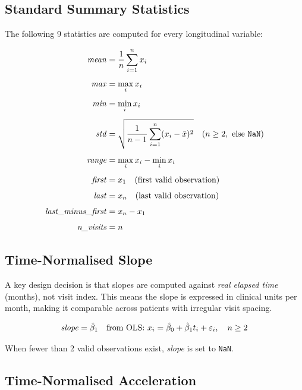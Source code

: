 \documentclass[11pt]{article}
\begin{document}
\subsection{Standard Summary Statistics}

The following 9 statistics are computed for every longitudinal variable:

\begin{align}
\text{\textit{mean}} &= \frac{1}{n} \sum_{i=1}^{n} x_i \label{eq:mean}\\[4pt]
\text{\textit{max}} &= \max_{i} x_i \\[4pt]
\text{\textit{min}} &= \min_{i} x_i \\[4pt]
\text{\textit{std}} &= \sqrt{\frac{1}{n-1}\sum_{i=1}^{n}(x_i - \bar{x})^2} \quad (n \geq 2, \text{ else } \texttt{NaN}) \\[4pt]
\text{\textit{range}} &= \max_{i} x_i - \min_{i} x_i \\[4pt]
\text{\textit{first}} &= x_1 \quad (\text{first valid observation}) \\[4pt]
\text{\textit{last}} &= x_n \quad (\text{last valid observation}) \\[4pt]
\text{\textit{last\_minus\_first}} &= x_n - x_1 \\[4pt]
\text{\textit{n\_visits}} &= n
\end{align}

\subsection{Time-Normalised Slope}

A key design decision is that slopes are computed against \emph{real elapsed time} (months), not visit index.  This means the slope is expressed in clinical units per month, making it comparable across patients with irregular visit spacing.

\begin{equation}
\text{\textit{slope}} = \hat{\beta}_1 \quad \text{from OLS: } x_i = \hat{\beta}_0 + \hat{\beta}_1 t_i + \varepsilon_i, \quad n \geq 2
\label{eq:slope}
\end{equation}

When fewer than 2 valid observations exist, \textit{slope} is set to \texttt{NaN}.

\subsection{Time-Normalised Acceleration}
\label{subsec:acceleration}
\end{document}
